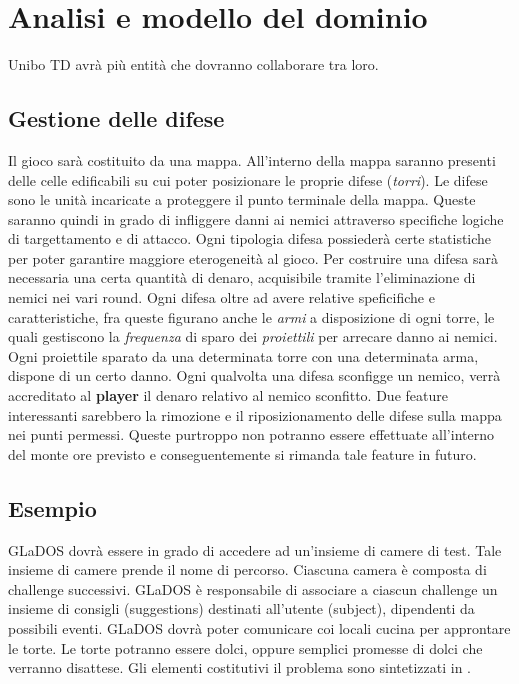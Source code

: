 \documentclass[a4paper,12pt]{report}
\begin{document}
\section{Analisi e modello del dominio}

Unibo TD avrà più entità che dovranno collaborare tra loro.

\subsection*{Gestione delle difese}
\begin{itemize}
Il gioco sarà costituito da una mappa. All'interno della mappa saranno presenti delle celle edificabili su cui poter posizionare le proprie difese (\textit{torri}). 
Le difese sono le unità incaricate a proteggere il punto terminale della mappa. Queste saranno quindi in grado di infliggere danni ai nemici attraverso specifiche logiche di targettamento e di attacco. Ogni tipologia difesa possiederà certe statistiche per poter garantire maggiore eterogeneità al gioco. Per costruire una difesa sarà necessaria una certa quantità di denaro, acquisibile tramite l'eliminazione di nemici nei vari round. Ogni difesa oltre ad avere relative speficifiche e caratteristiche, fra queste figurano anche le \textit{armi} a disposizione di ogni torre, le quali gestiscono la \textit{frequenza} di sparo dei \textit{proiettili} per arrecare danno ai nemici. Ogni proiettile sparato da una determinata torre con una determinata arma, dispone di un certo danno. Ogni qualvolta una difesa sconfigge un nemico, verrà accreditato al \textbf{player} il denaro relativo al nemico sconfitto. Due feature interessanti sarebbero la rimozione e il riposizionamento delle difese sulla mappa nei punti permessi. Queste purtroppo non potranno essere effettuate all’interno del monte ore previsto e conseguentemente si rimanda tale feature in futuro.
\end{itemize}

\subsection*{Esempio}
GLaDOS dovrà essere in grado di accedere ad un'insieme di camere di test.
%
Tale insieme di camere prende il nome di percorso.
%
Ciascuna camera è composta di challenge successivi.
%
GLaDOS è responsabile di associare a ciascun challenge un insieme di consigli (suggestions) destinati all'utente (subject), dipendenti da possibili eventi.
%
GLaDOS dovrà poter comunicare coi locali cucina per approntare le torte.
%
Le torte potranno essere dolci, oppure semplici promesse di dolci che verranno disattese.
%
Gli elementi costitutivi il problema sono sintetizzati in .
\end{document}
